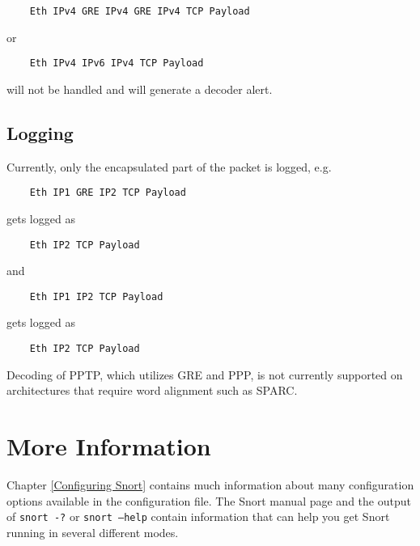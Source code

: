 \documentclass[english]{report}
\newenvironment{note}{
\samepage
    \vspace{10pt}{\textsf{
        {\hspace{7pt}\Huge{$\triangle$\hspace{-12.5pt}{\Large{$^!$}}}}\hspace{5pt}
        {\Large{NOTE}}
    }
    }
   \begin{center}
    \par\vspace{-17pt}

    \begin{lrbox}{\savepar}
    \begin{minipage}[r]{6in}
}
{
    \end{minipage}
    \end{lrbox}
    \fbox{
        \usebox{
            \savepar
	}
    }
    \par\vskip10pt
    \end{center}
}
\newenvironment{note}{
        \begin{rawhtml}
        <p><table border="1"><tr><td><b>
        Note:&nbsp;&nbsp;</b>
        \end{rawhtml}
}{
        \begin{rawhtml}
        </b></td></tr></table></p>
        \end{rawhtml}
}
\begin{document}
\begin{verbatim}
    Eth IPv4 GRE IPv4 GRE IPv4 TCP Payload
\end{verbatim}

or

\begin{verbatim}
    Eth IPv4 IPv6 IPv4 TCP Payload
\end{verbatim}

will not be handled and will generate a decoder alert.

\subsection{Logging}

Currently, only the encapsulated part of the packet is logged, e.g.

\begin{verbatim}
    Eth IP1 GRE IP2 TCP Payload
\end{verbatim}

gets logged as

\begin{verbatim}
    Eth IP2 TCP Payload
\end{verbatim}

and

\begin{verbatim}
    Eth IP1 IP2 TCP Payload
\end{verbatim}

gets logged as

\begin{verbatim}
    Eth IP2 TCP Payload
\end{verbatim}

\begin{note}

Decoding of PPTP, which utilizes GRE and PPP, is not currently supported on
architectures that require word alignment such as SPARC.

\end{note}

\section{More Information}

Chapter \ref{Configuring Snort} contains much information about many
configuration options available in the configuration file.  The Snort manual
page and the output of \texttt{snort -?} or \texttt{snort --help} contain
information that can help you get Snort running in several different modes.
\end{document}

